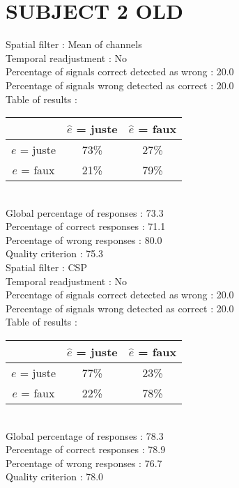 \section*{SUBJECT 2 OLD}
Spatial filter : Mean of channels \\
Temporal readjustment : No \\
Percentage of signals correct detected as wrong :   20.0 \\
Percentage of signals wrong detected as correct :   20.0 \\
Table of results : \\
\begin{tabular}{|c|c|c|}
\hline				& $\hat{e}$ = juste & $\hat{e}$ = faux \\
\hline  $e$ = juste	&     73\%			&     27\%		\\
\hline  $e$ = faux	&     21\%			&     79\%		\\
\hline
\end{tabular}\\
Global percentage of responses :   73.3 \\
Percentage of correct responses :   71.1 \\
Percentage of wrong responses :   80.0 \\
Quality criterion :   75.3 \\

Spatial filter : CSP \\
Temporal readjustment : No \\
Percentage of signals correct detected as wrong :   20.0 \\
Percentage of signals wrong detected as correct :   20.0 \\
Table of results : \\
\begin{tabular}{|c|c|c|}
\hline				& $\hat{e}$ = juste & $\hat{e}$ = faux \\
\hline  $e$ = juste	&     77\%			&     23\%		\\
\hline  $e$ = faux	&     22\%			&     78\%		\\
\hline
\end{tabular}\\
Global percentage of responses :   78.3 \\
Percentage of correct responses :   78.9 \\
Percentage of wrong responses :   76.7 \\
Quality criterion :   78.0 \\

